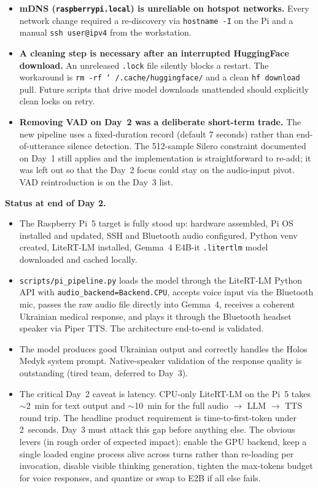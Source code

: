 \documentclass{article}
\theoremstyle{plain}
\theoremstyle{definition}
\theoremstyle{remark}
\begin{document}
\begin{itemize}
\item \textbf{mDNS (\texttt{raspberrypi.local}) is unreliable on hotspot networks.} Every network change required a re-discovery via \texttt{hostname -I} on the Pi and a manual \texttt{ssh user@ipv4} from the workstation.
\item \textbf{A cleaning step is necessary after an interrupted HuggingFace download.} An unreleased \texttt{.lock} file silently blocks a restart. The workaround is \texttt{rm -rf \char`~/.cache/huggingface/} and a clean \texttt{hf download} pull. Future scripts that drive model downloads unattended should explicitly clean locks on retry.
\item \textbf{Removing VAD on Day~2 was a deliberate short-term trade.} The new pipeline uses a fixed-duration record (default 7 seconds) rather than end-of-utterance silence detection. The 512-sample Silero constraint documented on Day~1 still applies and the implementation is straightforward to re-add; it was left out so that the Day~2 focus could stay on the audio-input pivot. VAD reintroduction is on the Day~3 list.
\end{itemize}

\textbf{Status at end of Day 2.}

\begin{itemize}
\item The Raspberry Pi~5 target is fully stood up: hardware assembled, Pi OS installed and updated, SSH and Bluetooth audio configured, Python venv created, LiteRT-LM installed, Gemma~4 E4B-it \texttt{.litertlm} model downloaded and cached locally.
\item \texttt{scripts/pi\_pipeline.py} loads the model through the LiteRT-LM Python API with \texttt{audio\_backend=Backend.CPU}, accepts voice input via the Bluetooth mic, passes the raw audio file directly into Gemma~4, receives a coherent Ukrainian medical response, and plays it through the Bluetooth headset speaker via Piper TTS. The architecture end-to-end is validated.
\item The model produces good Ukrainian output and correctly handles the Holos Medyk system prompt. Native-speaker validation of the response quality is outstanding (tired team, deferred to Day~3).
\item The critical Day~2 caveat is latency. CPU-only LiteRT-LM on the Pi~5 takes $\sim$2~min for text output and $\sim$10~min for the full audio $\rightarrow$ LLM $\rightarrow$ TTS round trip. The headline product requirement is time-to-first-token under 2~seconds. Day~3 must attack this gap before anything else. The obvious levers (in rough order of expected impact): enable the GPU backend, keep a single loaded engine process alive across turns rather than re-loading per invocation, disable visible thinking generation, tighten the max-tokens budget for voice responses, and quantize or swap to E2B if all else fails.
\end{itemize}
\end{document}
